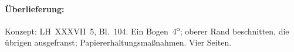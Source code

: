%
%
%
%
%
%
%   
%
%
%
%
%
%
%
%
\frenchspacing
%
\begin{ledgroupsized}[r]{120mm}
\footnotesize
\pstart
\noindent\textbf{Überlieferung:}
\pend
\end{ledgroupsized}
%
\begin{ledgroupsized}[r]{114mm}
\footnotesize
\pstart \parindent -6mm
%
Konzept:
LH~XXXVII~5, Bl.~104.
Ein Bogen~4\textsuperscript{o};
oberer Rand beschnitten, die übrigen ausgefranst;
Papiererhaltungsmaßnahmen.
Vier Seiten.
\pend
\end{ledgroupsized}
%
%
\vspace{5mm}
